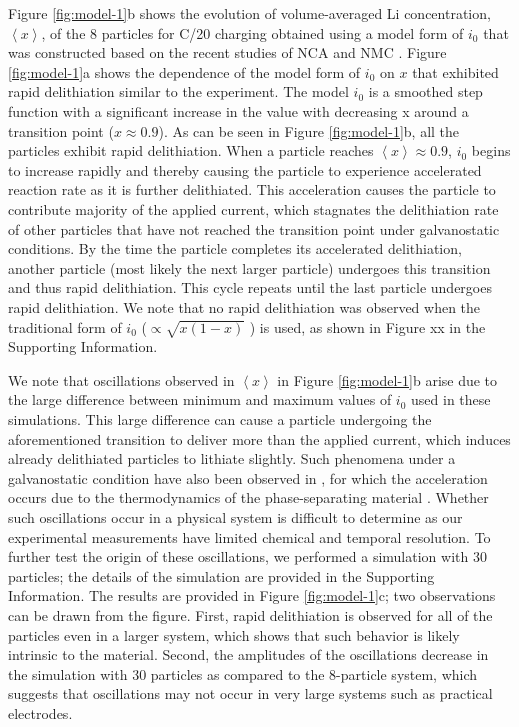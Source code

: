 \documentclass{article}
\begin{document}
Figure \ref{fig:model-1}b shows the evolution of volume-averaged Li concentration, $\left\langle x \right\rangle$, of the 8 particles for C/20 charging obtained using a model form of $i_0$ that was constructed based on the recent studies of NCA \cite{chueh2021} and NMC \cite{tsai2018, mukherjee2017, chiang2020}. Figure \ref{fig:model-1}a shows the dependence of the model form of  $i_0$ on $x$ that exhibited rapid delithiation similar to the experiment. The model $i_0$ is a smoothed step function with a significant increase in the value with decreasing x around a transition point ($x\approx0.9$). As can be seen in Figure \ref{fig:model-1}b, all the particles exhibit rapid delithiation. When a particle reaches $\left\langle x\right\rangle\approx0.9$, $i_0$ begins to increase rapidly and thereby causing the particle to experience accelerated reaction rate as it is further delithiated. This acceleration causes the particle to contribute majority of the applied current, which stagnates the delithiation rate of other particles that have not reached the transition point under galvanostatic conditions. By the time the particle completes its accelerated delithiation, another particle (most likely the next larger particle) undergoes this transition and thus rapid delithiation. This cycle repeats until the last particle undergoes rapid delithiation.  We note that no rapid delithiation was observed when the traditional form of $i_0$ ($\propto\sqrt{x(1-x)}$ \cite{newman1993, newman1994, newman1995, newman1996}) is used, as shown in Figure xx in the Supporting Information.

We note that oscillations observed in $\left\langle x\right\rangle$ in Figure \ref{fig:model-1}b arise due to the large difference between minimum and maximum values of $i_0$ used in these simulations. This large difference can cause a particle undergoing the aforementioned transition to deliver more than the applied current, which induces already delithiated particles to lithiate slightly. Such phenomena under a galvanostatic condition have also been observed in , for which the acceleration occurs due to the thermodynamics of the phase-separating material \cite{Orvananos_2015}. Whether such oscillations occur in a physical system is difficult to determine as our experimental measurements have limited chemical and temporal resolution. To further test the origin of these oscillations, we performed a simulation with 30 particles; the details of the simulation are provided in the Supporting Information. The results are provided in Figure \ref{fig:model-1}c; two observations can be drawn from the figure. First, rapid delithiation is observed for all of the particles even in a larger system, which shows that such behavior is likely intrinsic to the material. Second, the amplitudes of the oscillations decrease in the simulation with 30 particles as compared to the 8-particle system, which suggests that oscillations may not occur in very large systems such as practical electrodes. 
\end{document}
